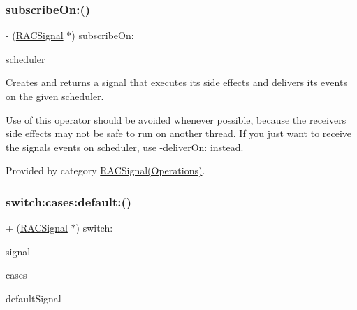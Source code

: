 \subsubsection{\texorpdfstring{subscribe\+On\+:()}{subscribeOn:()}\hspace{0.1cm}{\footnotesize\ttfamily [3/3]}}
{\footnotesize\ttfamily -\/ (\mbox{\hyperlink{interface_r_a_c_signal}{R\+A\+C\+Signal}} $\ast$) subscribe\+On\+: \begin{DoxyParamCaption}\item[{(\mbox{\hyperlink{interface_r_a_c_scheduler}{R\+A\+C\+Scheduler}} $\ast$)}]{scheduler }\end{DoxyParamCaption}}

Creates and returns a signal that executes its side effects and delivers its events on the given scheduler.

Use of this operator should be avoided whenever possible, because the receiver\textquotesingle{}s side effects may not be safe to run on another thread. If you just want to receive the signal\textquotesingle{}s events on {\ttfamily scheduler}, use -\/deliver\+On\+: instead. 

Provided by category \mbox{\hyperlink{category_r_a_c_signal_07_operations_08_a6b8db542f7106880577a943cb8e9da90}{R\+A\+C\+Signal(\+Operations)}}.

\mbox{\label{interface_r_a_c_signal_aac7816b22cfdcbe65cd43d99836ba1f5}} 
\subsubsection{\texorpdfstring{switch\+:cases\+:default\+:()}{switch:cases:default:()}\hspace{0.1cm}{\footnotesize\ttfamily [1/3]}}
{\footnotesize\ttfamily + (\mbox{\hyperlink{interface_r_a_c_signal}{R\+A\+C\+Signal}} $\ast$) switch\+: \begin{DoxyParamCaption}\item[{(\mbox{\hyperlink{interface_r_a_c_signal}{R\+A\+C\+Signal}} $\ast$)}]{signal }\item[{cases:(N\+S\+Dictionary $\ast$)}]{cases }\item[{default:(\mbox{\hyperlink{interface_r_a_c_signal}{R\+A\+C\+Signal}} $\ast$)}]{default\+Signal }\end{DoxyParamCaption}}

